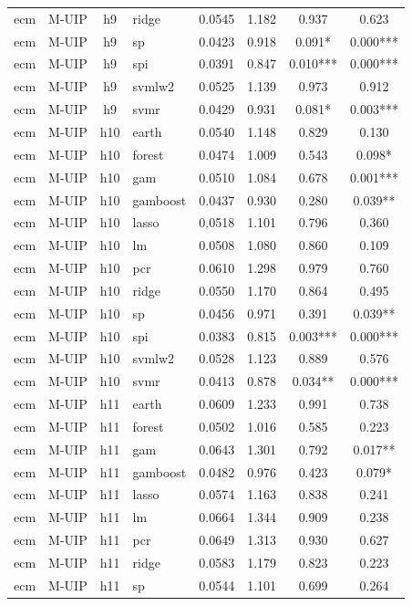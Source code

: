 \begin{ThreePartTable}
\begin{longtable}[t]{llclcccc}
ecm & M-UIP & h9 & ridge & 0.0545 & 1.182 & 0.937 & 0.623\\
ecm & M-UIP & h9 & sp & 0.0423 & 0.918 & 0.091* & 0.000***\\
ecm & M-UIP & h9 & spi & 0.0391 & 0.847 & 0.010*** & 0.000***\\
ecm & M-UIP & h9 & svmlw2 & 0.0525 & 1.139 & 0.973 & 0.912\\
ecm & M-UIP & h9 & svmr & 0.0429 & 0.931 & 0.081* & 0.003***\\
\addlinespace
ecm & M-UIP & h10 & earth & 0.0540 & 1.148 & 0.829 & 0.130\\
ecm & M-UIP & h10 & forest & 0.0474 & 1.009 & 0.543 & 0.098*\\
ecm & M-UIP & h10 & gam & 0.0510 & 1.084 & 0.678 & 0.001***\\
ecm & M-UIP & h10 & gamboost & 0.0437 & 0.930 & 0.280 & 0.039**\\
ecm & M-UIP & h10 & lasso & 0.0518 & 1.101 & 0.796 & 0.360\\
ecm & M-UIP & h10 & lm & 0.0508 & 1.080 & 0.860 & 0.109\\
ecm & M-UIP & h10 & pcr & 0.0610 & 1.298 & 0.979 & 0.760\\
ecm & M-UIP & h10 & ridge & 0.0550 & 1.170 & 0.864 & 0.495\\
ecm & M-UIP & h10 & sp & 0.0456 & 0.971 & 0.391 & 0.039**\\
ecm & M-UIP & h10 & spi & 0.0383 & 0.815 & 0.003*** & 0.000***\\
ecm & M-UIP & h10 & svmlw2 & 0.0528 & 1.123 & 0.889 & 0.576\\
ecm & M-UIP & h10 & svmr & 0.0413 & 0.878 & 0.034** & 0.000***\\
\addlinespace
ecm & M-UIP & h11 & earth & 0.0609 & 1.233 & 0.991 & 0.738\\
ecm & M-UIP & h11 & forest & 0.0502 & 1.016 & 0.585 & 0.223\\
ecm & M-UIP & h11 & gam & 0.0643 & 1.301 & 0.792 & 0.017**\\
ecm & M-UIP & h11 & gamboost & 0.0482 & 0.976 & 0.423 & 0.079*\\
ecm & M-UIP & h11 & lasso & 0.0574 & 1.163 & 0.838 & 0.241\\
ecm & M-UIP & h11 & lm & 0.0664 & 1.344 & 0.909 & 0.238\\
ecm & M-UIP & h11 & pcr & 0.0649 & 1.313 & 0.930 & 0.627\\
ecm & M-UIP & h11 & ridge & 0.0583 & 1.179 & 0.823 & 0.223\\
ecm & M-UIP & h11 & sp & 0.0544 & 1.101 & 0.699 & 0.264\\

\end{longtable}
\end{ThreePartTable}
